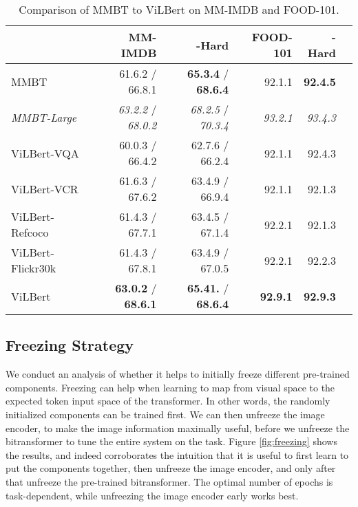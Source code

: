 \documentclass[11pt,a4paper]{article}
\begin{document}
\begin{table*}[t]
  \centering\small
  \begin{tabular}{lrrrrr}
    \toprule
    & MM-IMDB & -Hard & FOOD-101 & -Hard\\\midrule
  	MMBT & 61.6.2 / 66.8.1 & \textbf{65.3.4} / \textbf{68.6.4} & 92.1.1 & \textbf{92.4.5}\\ \emph{MMBT-Large} & \emph{63.2.2} / \emph{68.0.2} & \emph{68.2.5} / \emph{70.3.4} & \emph{93.2.1} & \emph{93.4.3}\\\midrule
	ViLBert-VQA & 60.0.3 / 66.4.2 & 62.7.6 / 66.2.4 & 92.1.1 & 92.4.3\\
	ViLBert-VCR & 61.6.3 / 67.6.2 & 63.4.9 / 66.9.4 & 92.1.1 & 92.1.3\\
	ViLBert-Refcoco & 61.4.3 / 67.7.1 & 63.4.5 / 67.1.4 & 92.2.1 & 92.1.3\\
	ViLBert-Flickr30k & 61.4.3 / 67.8.1 & 63.4.9 / 67.0.5 & 92.2.1 & 92.2.3\\
	ViLBert & \textbf{63.0.2} / \textbf{68.6.1} & \textbf{65.41.} / \textbf{68.6.4} & \textbf{92.9.1} & \textbf{92.9.3}\\
  	\bottomrule
  \end{tabular}
  \caption{Comparison of MMBT to ViLBert on MM-IMDB and FOOD-101.}
  \label{tab:vilbert}
\end{table*}





\subsection{Freezing Strategy}
We conduct an analysis of whether it helps to initially freeze different pre-trained components.
Freezing can help when learning to map from visual space to the expected token input space of the transformer. In other words, the randomly initialized components can be trained first.
We can then unfreeze the image encoder, to make the image information maximally useful, before we unfreeze the bitransformer to tune the entire system on the task. Figure \ref{fig:freezing} shows the results, and indeed corroborates the intuition that it is useful to first learn to put the components together, then unfreeze the image encoder, and only after that unfreeze the pre-trained bitransformer. The optimal number of epochs is task-dependent, while unfreezing the image encoder early works best.
\end{document}
